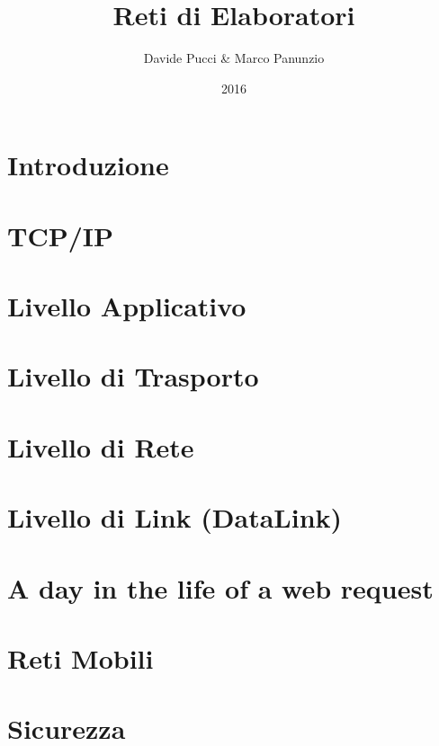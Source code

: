 

\title{Reti di Elaboratori}
\author{Davide Pucci \& Marco Panunzio}
\date{2016}



\maketitle

\tableofcontents

\chapter{Introduzione}


\chapter{TCP/IP}


\chapter{Livello Applicativo}


\chapter{Livello di Trasporto}


\chapter{Livello di Rete}


\chapter{Livello di Link (DataLink)}


\chapter{A day in the life of a web request}


\chapter{Reti Mobili}


\chapter{Sicurezza}


